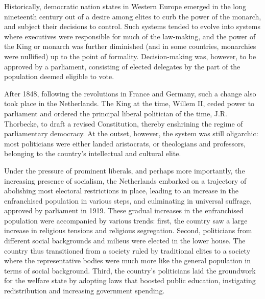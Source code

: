     Historically, democratic nation states in Western Europe emerged in the long nineteenth century out of a desire among elites to curb the power of the monarch, and subject their decisions to control. Such systems tended to evolve into systems where executives were responsible for much of the law-making, and the power of the King or monarch was further diminished (and in some countries, monarchies were nullified) up to the point of formality. Decision-making was, however, to be approved by a parliament, consisting of elected delegates by the part of the population deemed eligible to vote. 

    After 1848, following the revolutions in France and Germany, such a change also took place in the Netherlands. The King at the time, Willem II, ceded power to parliament and ordered the principal liberal politician of the time, J.R. Thorbecke, to draft a revised Constitution, thereby enshrining the regime of parliamentary democracy. At the outset, however, the system was still oligarchic: most politicians were either landed aristocrats, or theologians and professors, belonging to the country's intellectual and cultural elite. 

    Under the pressure of prominent liberals, and perhaps more importantly, the increasing presence of socialism, the Netherlands embarked on a trajectory of abolishing most electoral restrictions in place, leading to an increase in the enfranchised population in various steps, and culminating in universal suffrage, approved by parliament in 1919. These gradual increases in the enfranchised population were accompanied by various trends: first, the country saw a large increase in religious tensions and religious segregation. Second, politicians from different social backgrounds and milieus were elected in the lower house. The country thus transitioned from a society ruled by traditional elites to a society where the representative bodies were much more like the general population in terms of social background. \autocite{van1983toegang} Third, the country's politicians laid the groundwork for the welfare state by adopting laws that boosted public education, instigating redistribution and increasing government spending. 


